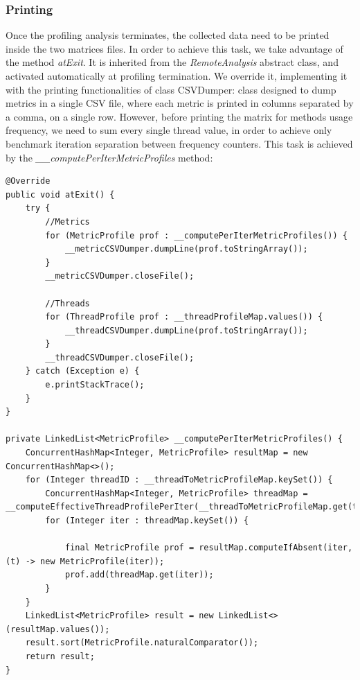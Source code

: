 \documentclass[]{usiinfthesis}
\begin{document}
    \subsubsection{Printing}
    Once the profiling analysis terminates, the collected data need to be printed inside the two matrices files.  In order to achieve this task, we take advantage of the method \textit{atExit}. It is inherited from the \textit{RemoteAnalysis} abstract class, and activated automatically at profiling termination. We override it, implementing it with the printing functionalities of class CSVDumper: class designed to dump metrics in a single CSV file, where each metric is printed in columns separated by a comma, on a single row. However, before printing the matrix for methods usage frequency, we need to sum every single thread value, in order to achieve only benchmark iteration separation between frequency counters. This task is achieved by the \textit{\_\_computePerIterMetricProfiles} method:
    \vspace*{0.25cm}
        \begin{verbatim}
@Override
public void atExit() {
    try {
        //Metrics
        for (MetricProfile prof : __computePerIterMetricProfiles()) {
            __metricCSVDumper.dumpLine(prof.toStringArray());
        }
        __metricCSVDumper.closeFile();

        //Threads
        for (ThreadProfile prof : __threadProfileMap.values()) {
            __threadCSVDumper.dumpLine(prof.toStringArray());
        }
        __threadCSVDumper.closeFile();
    } catch (Exception e) {
        e.printStackTrace();
    }
}

private LinkedList<MetricProfile> __computePerIterMetricProfiles() {
    ConcurrentHashMap<Integer, MetricProfile> resultMap = new ConcurrentHashMap<>();
    for (Integer threadID : __threadToMetricProfileMap.keySet()) {
        ConcurrentHashMap<Integer, MetricProfile> threadMap = __computeEffectiveThreadProfilePerIter(__threadToMetricProfileMap.get(threadID));
        for (Integer iter : threadMap.keySet()) {

            final MetricProfile prof = resultMap.computeIfAbsent(iter, (t) -> new MetricProfile(iter));
            prof.add(threadMap.get(iter));
        }
    }
    LinkedList<MetricProfile> result = new LinkedList<>(resultMap.values());
    result.sort(MetricProfile.naturalComparator());
    return result;
}
    \end{verbatim}
    
\end{document}

